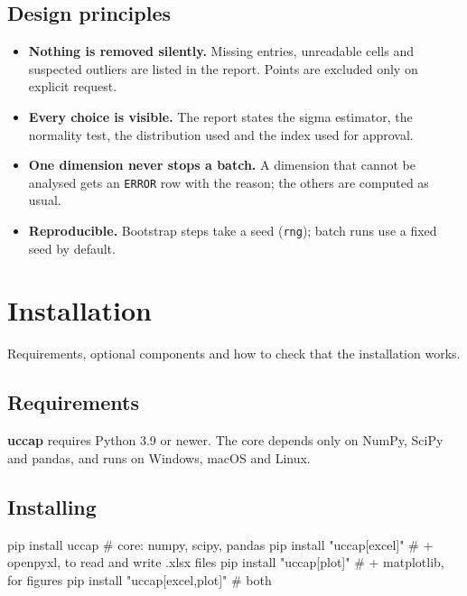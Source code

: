 \documentclass[a4paper,11pt,oneside,openany,parskip=half-,headings=standardclasses,toc=flat,numbers=noenddot]{scrbook}
\newcommand{\code}[1]{\texttt{\begingroup\def\_{\textunderscore\allowbreak}#1\endgroup}}
\newcommand{\pkg}{\textsf{\bfseries uccap}}
\newenvironment{chapterintro}{\begingroup\sffamily\small\color{muted}\noindent\ignorespaces}{\par\endgroup\medskip}
\begin{document}
\section{Design principles}
\begin{itemize}
\item \textbf{Nothing is removed silently.} Missing entries, unreadable cells and suspected outliers
  are listed in the report. Points are excluded only on explicit request.
\item \textbf{Every choice is visible.} The report states the sigma estimator, the normality test,
  the distribution used and the index used for approval.
\item \textbf{One dimension never stops a batch.} A dimension that cannot be analysed gets an
  \code{ERROR} row with the reason; the others are computed as usual.
\item \textbf{Reproducible.} Bootstrap steps take a seed (\code{rng}); batch runs use a fixed seed by
  default.
\end{itemize}

\chapter{Installation}\label{ch:install}

\begin{chapterintro}
Requirements, optional components and how to check that the installation works.
\end{chapterintro}

\section{Requirements}
\pkg{} requires Python 3.9 or newer. The core depends only on NumPy, SciPy and pandas, and runs on
Windows, macOS and Linux.

\section{Installing}

\begin{shcode}
pip install uccap                  # core: numpy, scipy, pandas
pip install "uccap[excel]"         # + openpyxl, to read and write .xlsx files
pip install "uccap[plot]"          # + matplotlib, for figures
pip install "uccap[excel,plot]"    # both
\end{shcode}
\end{document}
